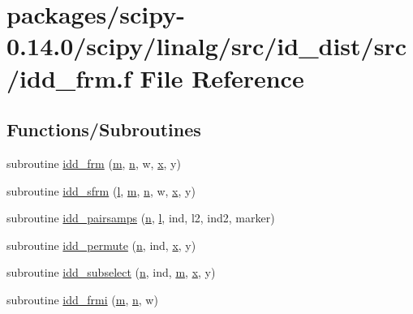 \hypertarget{idd__frm_8f}{}\section{packages/scipy-\/0.14.0/scipy/linalg/src/id\+\_\+dist/src/idd\+\_\+frm.f File Reference}
\label{idd__frm_8f}
\subsection*{Functions/\+Subroutines}
\begin{DoxyCompactItemize}
\item 
subroutine \hyperlink{idd__frm_8f_a0c0425158e8311a42213b3bee91dc945}{idd\+\_\+frm} (\hyperlink{indexexpr_8h_ab72fdb4031d47b75ab26dd18a437bcdc}{m}, \hyperlink{indexexpr_8h_ab427e2e2b4d6cec55fa088ea2a692ace}{n}, w, \hyperlink{vecnorm1_8cc_ac73eed9e41ec09d58f112f06c2d6cb63}{x}, y)
\item 
subroutine \hyperlink{idd__frm_8f_ae007c7c8e7f0b02737652ef3c0575325}{idd\+\_\+sfrm} (\hyperlink{indexexpr_8h_a88aacdaa46b76729743ee33ef8b95a58}{l}, \hyperlink{indexexpr_8h_ab72fdb4031d47b75ab26dd18a437bcdc}{m}, \hyperlink{indexexpr_8h_ab427e2e2b4d6cec55fa088ea2a692ace}{n}, w, \hyperlink{vecnorm1_8cc_ac73eed9e41ec09d58f112f06c2d6cb63}{x}, y)
\item 
subroutine \hyperlink{idd__frm_8f_a04b1b14056dd8a8f07144ca7203083be}{idd\+\_\+pairsamps} (\hyperlink{indexexpr_8h_ab427e2e2b4d6cec55fa088ea2a692ace}{n}, \hyperlink{indexexpr_8h_a88aacdaa46b76729743ee33ef8b95a58}{l}, ind, l2, ind2, marker)
\item 
subroutine \hyperlink{idd__frm_8f_a1ae442b5658013daf3cfb3ef7694ddce}{idd\+\_\+permute} (\hyperlink{indexexpr_8h_ab427e2e2b4d6cec55fa088ea2a692ace}{n}, ind, \hyperlink{vecnorm1_8cc_ac73eed9e41ec09d58f112f06c2d6cb63}{x}, y)
\item 
subroutine \hyperlink{idd__frm_8f_a147b80ea8fa17a01e32bdad1e753c219}{idd\+\_\+subselect} (\hyperlink{indexexpr_8h_ab427e2e2b4d6cec55fa088ea2a692ace}{n}, ind, \hyperlink{indexexpr_8h_ab72fdb4031d47b75ab26dd18a437bcdc}{m}, \hyperlink{vecnorm1_8cc_ac73eed9e41ec09d58f112f06c2d6cb63}{x}, y)
\item 
subroutine \hyperlink{idd__frm_8f_afa2a2b92dbe3df7ce8ed45934dca4fff}{idd\+\_\+frmi} (\hyperlink{indexexpr_8h_ab72fdb4031d47b75ab26dd18a437bcdc}{m}, \hyperlink{indexexpr_8h_ab427e2e2b4d6cec55fa088ea2a692ace}{n}, w)

\end{DoxyCompactItemize}
